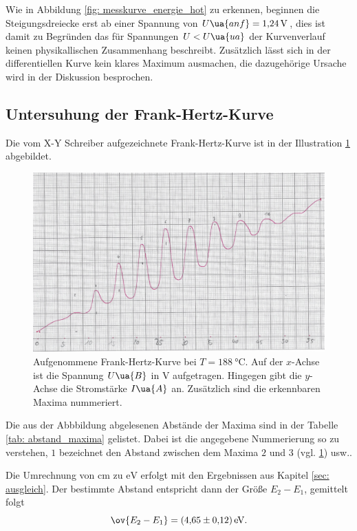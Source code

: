Wie in Abbildung \ref{fig: messkurve_energie_hot} zu erkennen, beginnen die Steigungsdreiecke erst ab
einer Spannung von $U\ua{anf}=\SI{1.24}{\volt}$, dies ist damit zu Begründen das für Spannungen $U<U\ua{ua}$
der Kurvenverlauf keinen physikallischen Zusammenhang beschreibt.
Zusätzlich lässt sich in der differentiellen Kurve kein klares Maximum ausmachen, die dazugehörige Ursache wird in
der Diskussion besprochen.
\FloatBarrier
\subsection{Untersuhung der Frank-Hertz-Kurve}\label{sec: frank}
\FloatBarrier
Die vom X-Y Schreiber aufgezeichnete Frank-Hertz-Kurve ist in der Illustration \ref{fig: messkurve_frank_hertz} abgebildet.
\begin{figure}
  \centering
  \includegraphics[width=0.8 \textwidth]{./pics/frank_hertz_kurve.png}
  \caption{Aufgenommene Frank-Hertz-Kurve bei $T=\SI{188}{\celsius}$. Auf der $x$-Achse ist die Spannung $U\ua{B}$ in $\si{\volt}$ aufgetragen.
          Hingegen gibt die $y$-Achse die Stromstärke $I\ua{A}$ an. Zusätzlich sind die erkennbaren Maxima nummeriert.}
  \label{fig: messkurve_frank_hertz}
\end{figure}
Die aus der Abbbildung abgelesenen Abstände der Maxima sind in der Tabelle \ref{tab: abstand_maxima} gelistet.
Dabei ist die angegebene Nummerierung so zu verstehen, $1$ bezeichnet den Abstand zwischen dem Maxima $2$ und $3$ (vgl. \ref{fig: messkurve_frank_hertz}) usw..

Die Umrechnung von $\si{\centi\meter}$ zu $\si{\eV}$ erfolgt mit den Ergebnissen aus Kapitel \ref{sec: ausgleich}.
Der bestimmte Abstand entspricht dann der Größe $E_2-E_1$, gemittelt folgt
\begin{equation}
  \label{eq:austrittarbeit}
\ov{E_2-E_1}=\SI{4.65\pm0.12}{\eV}.
\end{equation}
